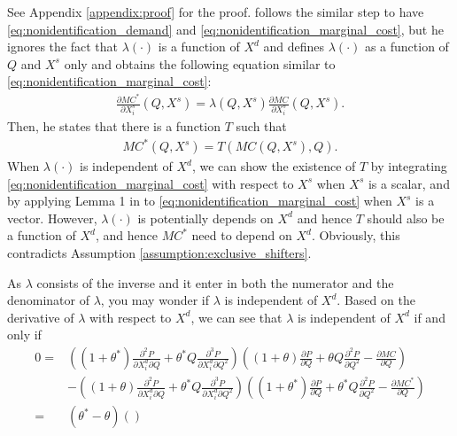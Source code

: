 \documentclass[11pt, a4paper]{article}
\theoremstyle{remark}
\begin{document}
See Appendix \ref{appendix:proof} for the proof.
\citet{lau1982identifying} follows the similar step to have \eqref{eq:nonidentification_demand} and \eqref{eq:nonidentification_marginal_cost}, but he ignores the fact that $\lambda(\cdot)$ is a function of $X^{d}$ and defines $\lambda(\cdot)$ as a function of $Q$ and $X^{s}$ only and obtains the following equation similar to \eqref{eq:nonidentification_marginal_cost}:
\begin{align}
    \frac{\partial MC^{*}}{\partial X^{s}_i}(Q, X^{s}) = \lambda(Q, X^{s}) \frac{\partial MC}{\partial X^{s}_i}(Q, X^{s}).
\end{align}
Then, he states that there is a function $T$ such that 
\begin{align}
    MC^{*}(Q, X^{s}) = T(MC(Q, X^{s}), Q).
\end{align}
When $\lambda(\cdot)$ is independent of $X^{d}$, we can show the existence of $T$ by integrating  \eqref{eq:nonidentification_marginal_cost} with respect to $X^{s}$ when $X^{s}$ is a scalar, and by applying Lemma 1 in \citet{goldmanNote1964} to \eqref{eq:nonidentification_marginal_cost} when $X^{s}$ is a vector.
However, $\lambda(\cdot)$ is potentially depends on $X^{d}$ and hence $T$ should also be a function of $X^{d}$, and hence $MC^{*}$ need to depend on $X^{d}$.
Obviously, this contradicts Assumption \ref{assumption:exclusive_shifters}.





As $\lambda$ consists of the inverse and it enter in both the numerator and the denominator of $\lambda$, you may wonder if $\lambda$ is independent of $X^{d}$.
Based on the derivative of $\lambda$ with respect to $X^{d}$, we can see that $\lambda$ is independent of $X^{d}$ if and only if
\begin{align}
    0 =  & \left((1+\theta^{*}) \frac{\partial^2 P}{\partial X^{d}_i \partial Q} + \theta^{*} Q \frac{\partial^3 P}{\partial X^{d}_i \partial Q^2}\right)\left((1+\theta) \frac{\partial P}{\partial Q} + \theta Q \frac{\partial^2 P}{\partial Q^2} - \frac{\partial MC}{\partial Q}\right)\\
    & - \left((1+\theta) \frac{\partial^2 P}{\partial X^{d}_i \partial Q} + \theta^{*} Q \frac{\partial^3 P}{\partial X^{d}_i \partial Q^2}\right) \left((1+\theta^{*}) \frac{\partial P}{\partial Q} + \theta^{*} Q \frac{\partial^2 P}{\partial Q^2} - \frac{\partial MC^{*}}{\partial Q}\right)\\
    = & (\theta^{*} - \theta) \left(\right)
\end{align}
\end{document}
